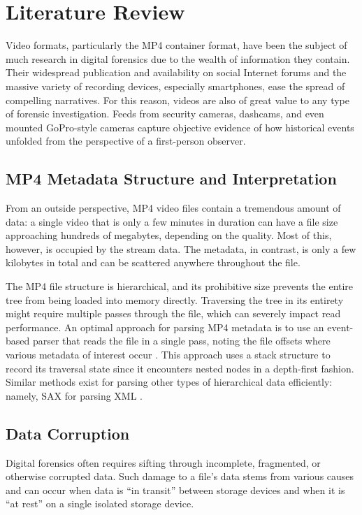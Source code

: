 \chapter{Literature Review}
\label{cha:literature-review}

Video formats, particularly the MP4 container format, have been the subject of much research in digital forensics due to the wealth of information they contain. Their widespread publication and availability on social Internet forums and the massive variety of recording devices, especially smartphones, ease the spread of compelling narratives. For this reason, videos are also of great value to any type of forensic investigation. Feeds from security cameras, dashcams, and even mounted GoPro-style cameras capture objective evidence of how historical events unfolded from the perspective of a first-person observer.

\section{MP4 Metadata Structure and Interpretation}

From an outside perspective, MP4 video files contain a tremendous amount of data: a single video that is only a few minutes in duration can have a file size approaching hundreds of megabytes, depending on the quality. Most of this, however, is occupied by the stream data. The metadata, in contrast, is only a few kilobytes in total and can be scattered anywhere throughout the file.

The MP4 file structure is hierarchical, and its prohibitive size prevents the entire tree from being loaded into memory directly. Traversing the tree in its entirety might require multiple passes through the file, which can severely impact read performance. An optimal approach for parsing MP4 metadata is to use an event-based parser that reads the file in a single pass, noting the file offsets where various metadata of interest occur \cite{zhao2010}. This approach uses a stack structure to record its traversal state since it encounters nested nodes in a depth-first fashion. Similar methods exist for parsing other types of hierarchical data efficiently: namely, SAX for parsing XML \cite{fegaras2004}.

\section{Data Corruption}

Digital forensics often requires sifting through incomplete, fragmented, or otherwise corrupted data. Such damage to a file's data stems from various causes and can occur when data is ``in transit'' between storage devices and when it is ``at rest'' on a single isolated storage device.

